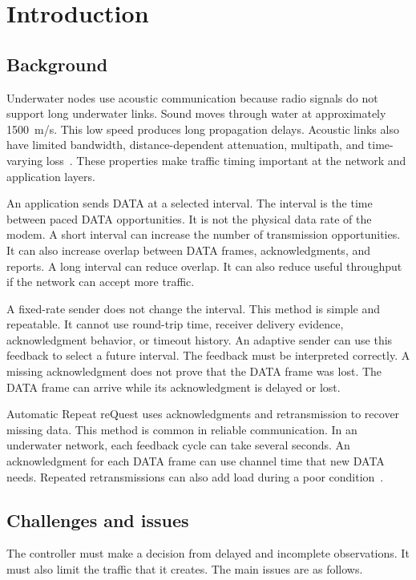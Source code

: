 \documentclass[11pt]{article}
\begin{document}
\clearpage
\section{Introduction}\label{sec:intro}

\subsection{Background}\label{sec:background}
\noindent
Underwater nodes use acoustic communication because radio signals do not support long underwater links.
Sound moves through water at approximately 1500~m/s.
This low speed produces long propagation delays.
Acoustic links also have limited bandwidth, distance-dependent attenuation, multipath, and time-varying loss~\cite{akyildiz2005,casari2011}.
These properties make traffic timing important at the network and application layers.

An application sends DATA at a selected interval.
The interval is the time between paced DATA opportunities.
It is not the physical data rate of the modem.
A short interval can increase the number of transmission opportunities.
It can also increase overlap between DATA frames, acknowledgments, and reports.
A long interval can reduce overlap.
It can also reduce useful throughput if the network can accept more traffic.

A fixed-rate sender does not change the interval.
This method is simple and repeatable.
It cannot use round-trip time, receiver delivery evidence, acknowledgment behavior, or timeout history.
An adaptive sender can use this feedback to select a future interval.
The feedback must be interpreted correctly.
A missing acknowledgment does not prove that the DATA frame was lost.
The DATA frame can arrive while its acknowledgment is delayed or lost.

Automatic Repeat reQuest uses acknowledgments and retransmission to recover missing data.
This method is common in reliable communication.
In an underwater network, each feedback cycle can take several seconds.
An acknowledgment for each DATA frame can use channel time that new DATA needs.
Repeated retransmissions can also add load during a poor condition~\cite{tan2007}.

\subsection{Challenges and issues}\label{sec:challenges}
\noindent
The controller must make a decision from delayed and incomplete observations.
It must also limit the traffic that it creates.
The main issues are as follows.
\end{document}
